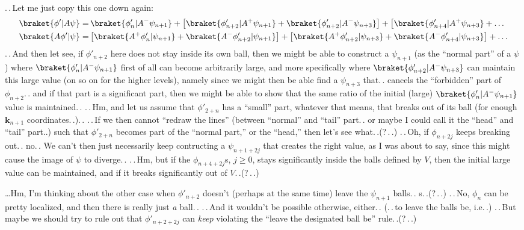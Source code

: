 \documentclass{report}
\begin{document}
.\,.\,Let me just copy this one down again:
\begin{align}
\begin{aligned}
	\braket{\phi'| A \psi} =&\, 
		\braket{\phi'_{n}   | A^- \psi_{n+1}} + \big[
		\braket{\phi'_{n+2} | A^+ \psi_{n+1}} + 
		\braket{\phi'_{n+2} | A^- \psi_{n+3}} \big] + \big[
		\braket{\phi'_{n+4} | A^+ \psi_{n+3}} + 
		\ldots\\
	\braket{A \phi'| \psi} =&\, 
		\big[
		\braket{A^+ \phi'_{n}   | \psi_{n+1}} + 
		\braket{A^- \phi'_{n+2} | \psi_{n+1}} \big] + \big[ 
		\braket{A^+ \phi'_{n+2} | \psi_{n+3}} + 
		\braket{A^- \phi'_{n+4} | \psi_{n+3}} \big] + 
		\ldots
\end{aligned}
\end{align}
.\,.\,And then let see, if $\phi'_{n+2}$ here does not stay inside its own ball, then we might be able to construct a $\psi_{n+1}$ (as the ``normal part'' of a $\psi$) where $\braket{\phi'_{n}   | A^- \psi_{n+1}}$ first of all can become arbitrarily large, and more specifically where $\braket{\phi'_{n+2} | A^- \psi_{n+3}}$ can maintain this large value (on so on for the higher levels), namely since we might then be able find a $\psi_{n+3}$ that.\,. cancels the ``forbidden'' part of $\phi_{n+2}$.\,. and if that part is a significant part, then we might be able to show that the same ratio of the initial (large) $\braket{\phi'_{n}   | A^- \psi_{n+1}}$ value is maintained.\,. .\,.\,Hm, and let us assume that $\phi'_{2+n}$ has a ``small'' part, whatever that means, that breaks out of its ball (for enough $\mathbf{k}_{n+1}$ coordinates.\,.).\,. .\,.\,If we then cannot ``redraw the lines'' (between ``normal'' and ``tail'' part.\,. or maybe I could call it the ``head'' and ``tail'' part..) such that $\phi'_{2+n}$ becomes part of the ``normal part,'' or the ``head,'' then let's see what.\,.(?\,.\,.) %
.\,.\,Oh, if $\phi_{n+2j}$ keeps breaking out.\,. no.\,. We can't then just necessarily keep contructing a $\psi_{n+1+2j}$ that creates the right value, as I was about to say, since this might cause the image of $\psi$ to diverge.\,. %
.\,.\,Hm, but if the $\phi_{n+4+2j}$s, $j\geq 0$, stays significantly inside the balls defined by $V$, then the initial large value can be maintained, and if it breaks significantly out of $V$.\,.(?\,.\,.) %

\ldots Hm, I'm thinking about the other case when $\phi'_{n+2}$ doesn't (perhaps at the same time) leave the $\psi_{n+1}$ balls.\,. s.\,.(?\,.\,.) .\,.\,No, $\phi_n$ can be pretty localized, and then there is really just \emph{a} ball.\,. .\,.\,And it wouldn't be possible otherwise, either.\,. (.\,.\,to leave the balls be, i.e.\,.) .\,.\,But maybe we should try to rule out that $\phi'_{n+2+2j}$ can \emph{keep} violating the ``leave the designated ball be'' rule.\,.(?\,.\,.)  
\end{document}
